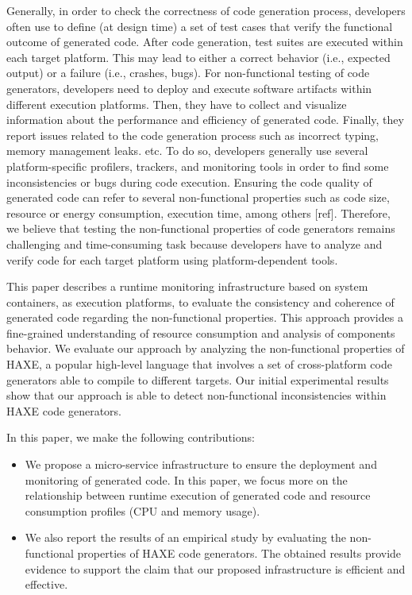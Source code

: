 Generally, in order to check the correctness of code generation process, developers often use to define (at design time) a set of test cases that verify the functional outcome of generated code. After code generation, test suites are executed within each target platform. This may lead to either a correct behavior (i.e., expected output) or a failure (i.e., crashes, bugs). 
For non-functional testing of code generators, developers need to deploy and execute software artifacts within different execution platforms. Then, they have to collect and visualize information about the performance and efficiency of generated code. Finally, they report issues related to the code generation process such as incorrect typing, memory management leaks. etc. To do so, developers generally use several platform-specific profilers, trackers, and monitoring tools in order to find some inconsistencies or bugs during code execution. Ensuring the code quality of generated code can refer to several non-functional properties such as code size, resource or energy consumption, execution time, among others [ref]. Therefore, we believe that testing the non-functional properties of code generators remains challenging and time-consuming task because developers have to analyze and verify code for each target platform using platform-dependent tools.

This paper describes a runtime monitoring infrastructure based on system containers, as execution platforms, to evaluate the consistency and coherence of generated code regarding the non-functional properties. This approach provides a fine-grained understanding of resource consumption and analysis of components behavior. 
We evaluate our approach by analyzing the non-functional properties of HAXE, a popular high-level language that involves a set of cross-platform code generators able to compile to different targets. Our initial experimental results show that our approach is able to detect non-functional inconsistencies within HAXE code generators.


In this paper, we make the following contributions:
\begin{itemize} 	
	
	\item We propose a micro-service infrastructure to ensure the deployment and monitoring of generated code. In this paper, we focus more on the relationship between runtime execution of generated code and resource consumption profiles (CPU and memory usage).
	\item We also report the results of an empirical study by evaluating the non-functional properties of HAXE code generators. The obtained results provide evidence to support the claim that our proposed infrastructure is efficient and effective.
	
	
\end{itemize}

